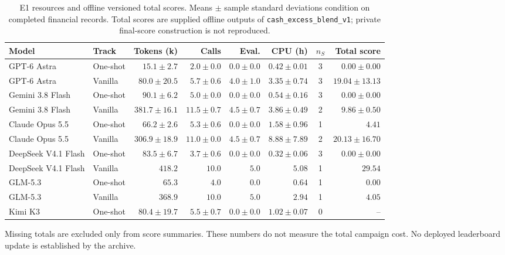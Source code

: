 \begin{table}[htbp]
\centering
\footnotesize
\caption{E1 resources and offline versioned total scores. Means $\pm$ sample standard deviations condition on completed financial records. Total scores are supplied offline outputs of \texttt{cash\_excess\_blend\_v1}; private final-score construction is not reproduced.}
\label{tab:resources}
\setlength{\tabcolsep}{3pt}
\begin{tabular}{@{}llrrrrcr@{}}
\toprule
Model & Track & Tokens (k) & Calls & Eval. & CPU (h) & $n_S$ & Total score \\
\midrule
GPT-6 Astra & One-shot & $15.1 \pm 2.7$ & $2.0 \pm 0.0$ & $0.0 \pm 0.0$ & $0.42 \pm 0.01$ & 3 & $0.00 \pm 0.00$ \\
GPT-6 Astra & Vanilla & $80.0 \pm 20.5$ & $5.7 \pm 0.6$ & $4.0 \pm 1.0$ & $3.35 \pm 0.74$ & 3 & $19.04 \pm 13.13$ \\
Gemini 3.8 Flash & One-shot & $90.1 \pm 6.2$ & $5.0 \pm 0.0$ & $0.0 \pm 0.0$ & $0.54 \pm 0.16$ & 3 & $0.00 \pm 0.00$ \\
Gemini 3.8 Flash & Vanilla & $381.7 \pm 16.1$ & $11.5 \pm 0.7$ & $4.5 \pm 0.7$ & $3.86 \pm 0.49$ & 2 & $9.86 \pm 0.50$ \\
Claude Opus 5.5 & One-shot & $66.2 \pm 2.6$ & $5.3 \pm 0.6$ & $0.0 \pm 0.0$ & $1.58 \pm 0.96$ & 1 & $4.41$ \\
Claude Opus 5.5 & Vanilla & $306.9 \pm 18.9$ & $11.0 \pm 0.0$ & $4.5 \pm 0.7$ & $8.88 \pm 7.89$ & 2 & $20.13 \pm 16.70$ \\
DeepSeek V4.1 Flash & One-shot & $83.5 \pm 6.7$ & $3.7 \pm 0.6$ & $0.0 \pm 0.0$ & $0.32 \pm 0.06$ & 3 & $0.00 \pm 0.00$ \\
DeepSeek V4.1 Flash & Vanilla & $418.2$ & $10.0$ & $5.0$ & $5.08$ & 1 & $29.54$ \\
GLM-5.3 & One-shot & $65.3$ & $4.0$ & $0.0$ & $0.64$ & 1 & $0.00$ \\
GLM-5.3 & Vanilla & $368.9$ & $10.0$ & $5.0$ & $2.94$ & 1 & $4.05$ \\
Kimi K3 & One-shot & $80.4 \pm 19.7$ & $5.5 \pm 0.7$ & $0.0 \pm 0.0$ & $1.02 \pm 0.07$ & 0 & -- \\
\bottomrule
\end{tabular}
\par\smallskip
\begin{minipage}{\linewidth}\footnotesize Missing totals are excluded only from score summaries. These numbers do not measure the total campaign cost. No deployed leaderboard update is established by the archive.\end{minipage}
\end{table}
